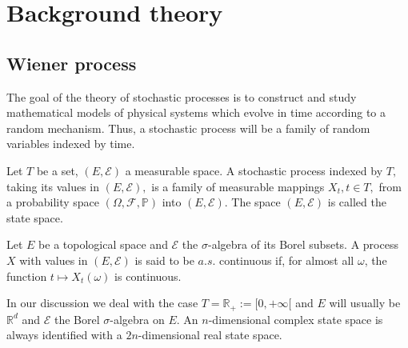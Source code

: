 \chapter{Background theory}
\section{Wiener process}
The goal of the theory of stochastic processes is to construct and study mathematical models of physical systems which evolve in time according to a random mechanism. Thus, a stochastic process will be a family of random variables indexed by time.
\begin{definition}
	Let $T$ be a set, $(E, \mathcal{E})$ a measurable space. A stochastic process indexed by $T,$ taking its values in $(E, \mathcal{E}),$ is a family of measurable mappings $X_{t}, t \in T,$ from a probability space $(\Omega, \mathcal{F}, \mathbb{P})$ into $(E, \mathcal{E})$. The space $(E, \mathcal{E})$ is called the state space.
\end{definition}
%
\begin{definition}
	Let $E$ be a topological space and $\mathcal{E}$ the $\sigma$-algebra of its Borel subsets. A process $X$ with values in $(E, \mathcal{E})$ is said to be $a.s.$ continuous if, for almost all $\omega$, the function $t \mapsto X_{t}(\omega)$ is continuous.
\end{definition}
In our discussion we deal with the case $T=\mathbb{R}_{+}:=[0,+\infty [$ and $E$ will usually be $\mathbb{R}^{d}$ and $\mathcal{E}$ the Borel $\sigma$-algebra on $E$. An $ n $-dimensional complex state space is always identified with a $ 2n $-dimensional real state space.
%



